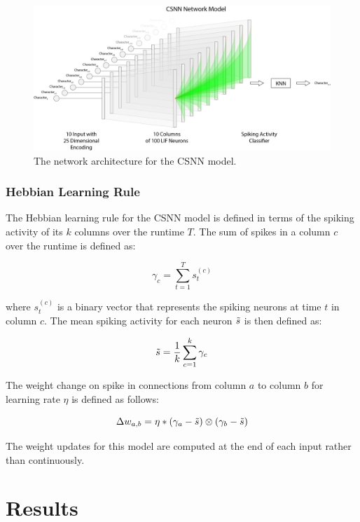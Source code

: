 \documentclass{article}
\begin{document}
\begin{figure}[H]
    \centering
    \includegraphics[width=0.9\linewidth]{../diagrams/csnn.png}
    \caption{The network architecture for the CSNN model.}
    \label{fig:csnn-network-diagram}
\end{figure}

\subsubsection*{Hebbian Learning Rule}
The Hebbian learning rule for the CSNN model is defined in terms of the spiking activity of its $k$ columns over the runtime $T$. The sum of spikes in a column $c$ over the runtime is defined as:

\begin{equation}
    \gamma_c = \sum_{t = 1}^{T}{s_t^{\left(c\right)}}
\end{equation}

where $s_t^{\left(c\right)}$ is a binary vector that represents the spiking neurons at time $t$ in column $c$. The mean spiking activity for each neuron $\Tilde{s}$ is then defined as:

\begin{equation}
    \Tilde{s} = \frac{1}{k} \sum_{c = 1}^{k}{\gamma_c}
    \label{eq:mean_spikes_equation}
\end{equation}

The weight change on spike in connections from column $a$ to column $b$ for learning rate $\eta$ is defined as follows:

\begin{equation}
    \Delta w_{a,b} = \eta * (\gamma_a - \Tilde{s})\otimes(\gamma_b - \Tilde{s})
\end{equation}

The weight updates for this model are computed at the end of each input rather than continuously.

\section*{Results}
\end{document}

